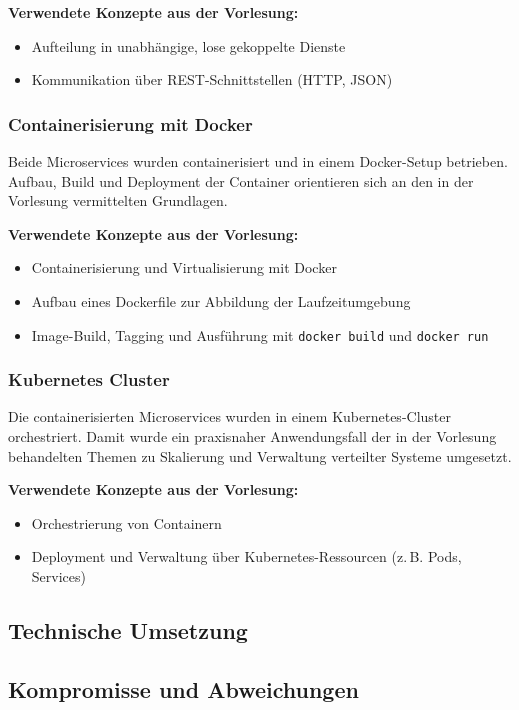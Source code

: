 \textbf{Verwendete Konzepte aus der Vorlesung:}
\begin{itemize}
  \item Aufteilung in unabhängige, lose gekoppelte Dienste
  \item Kommunikation über REST-Schnittstellen (HTTP, JSON)
\end{itemize}

\subsubsection{Containerisierung mit Docker}

Beide Microservices wurden containerisiert und in einem Docker-Setup betrieben. Aufbau, Build und Deployment der Container orientieren sich an den in der Vorlesung vermittelten Grundlagen.

\textbf{Verwendete Konzepte aus der Vorlesung:}
\begin{itemize}
  \item Containerisierung und Virtualisierung mit Docker
  \item Aufbau eines Dockerfile zur Abbildung der Laufzeitumgebung
  \item Image-Build, Tagging und Ausführung mit \texttt{docker build} und \texttt{docker run}
\end{itemize}

\subsubsection{Kubernetes Cluster}

Die containerisierten Microservices wurden in einem Kubernetes-Cluster orchestriert. Damit wurde ein praxisnaher Anwendungsfall der in der Vorlesung behandelten Themen zu Skalierung und Verwaltung verteilter Systeme umgesetzt.

\textbf{Verwendete Konzepte aus der Vorlesung:}
\begin{itemize}
  \item Orchestrierung von Containern
  \item Deployment und Verwaltung über Kubernetes-Ressourcen (z.\,B. Pods, Services)
\end{itemize}


\subsection{Technische Umsetzung}

\subsection{Kompromisse und Abweichungen}
